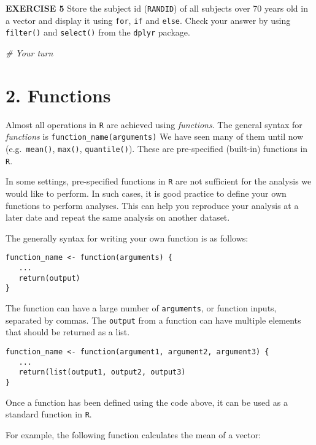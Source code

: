 \documentclass[
]{article}
\newenvironment{Shaded}{\begin{snugshade}}{\end{snugshade}}
\newcommand{\CommentTok}[1]{\textcolor[rgb]{0.56,0.35,0.01}{\textit{#1}}}
\begin{document}
\textbf{EXERCISE 5} Store the subject id (\texttt{RANDID}) of all
subjects over 70 years old in a vector and display it using
\texttt{for}, \texttt{if} and \texttt{else}. Check your answer by using
\texttt{filter()} and \texttt{select()} from the \texttt{dplyr} package.

\begin{Shaded}
\begin{Highlighting}[]
\CommentTok{# Your turn}
\end{Highlighting}
\end{Shaded}

\hypertarget{functions}{%
\section{2. Functions}\label{functions}}

Almost all operations in \texttt{R} are achieved using \emph{functions}.
The general syntax for \emph{functions} is
\texttt{function\_name(arguments)} We have seen many of them until now
(e.g.~\texttt{mean()}, \texttt{max()}, \texttt{quantile()}). These are
pre-specified (built-in) functions in \texttt{R}.

In some settings, pre-specified functions in \texttt{R} are not
sufficient for the analysis we would like to perform. In such cases, it
is good practice to define your own functions to perform analyses. This
can help you reproduce your analysis at a later date and repeat the same
analysis on another dataset.

The generally syntax for writing your own function is as follows:

\begin{verbatim}
function_name <- function(arguments) {
   ...
   return(output)
}
\end{verbatim}

The function can have a large number of \texttt{arguments}, or function
inputs, separated by commas. The \texttt{output} from a function can
have multiple elements that should be returned as a list.

\begin{verbatim}
function_name <- function(argument1, argument2, argument3) {
   ...
   return(list(output1, output2, output3)
}
\end{verbatim}

Once a function has been defined using the code above, it can be used as
a standard function in \texttt{R}.

For example, the following function calculates the mean of a vector:
\end{document}
